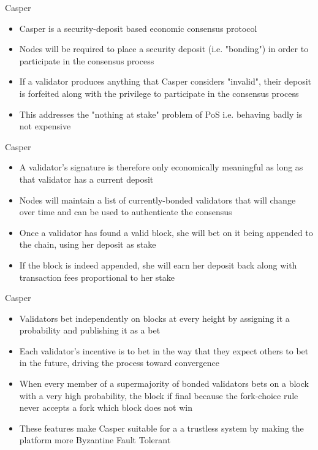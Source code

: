 \documentclass[10pt]{beamer}
\begin{document}

\begin{frame}{Casper}
	\begin{itemize}
		\item Casper is a security-deposit based economic consensus protocol
		\item Nodes will be required to place a security deposit (i.e. "bonding") in order to participate in the consensus process
		\item If a validator produces anything that Casper considers "invalid", their deposit is forfeited along with the privilege to participate in the consensus process
		\item This addresses the "nothing at stake" problem of PoS i.e. behaving badly is not expensive
	\end{itemize}
\end{frame}


\begin{frame}{Casper}
	\begin{itemize}
		\item A validator's signature is therefore only economically meaningful as long as that validator has a current deposit
		\item Nodes will maintain a list of currently-bonded validators that will change over time and can be used to authenticate the consensus
		\item Once a validator has found a valid block, she will bet on it being appended to the chain, using her deposit as stake
		\item If the block is indeed appended, she will earn her deposit back along with transaction fees proportional to her stake
	\end{itemize}
\end{frame}


\begin{frame}{Casper}
	\begin{itemize}
		\item Validators bet independently on blocks at every height by assigning it a probability and publishing it as a bet
		\item Each validator's incentive is to bet in the way that they expect others to bet in the future, driving the process toward convergence
		\item When every member of a supermajority of bonded validators bets on a block with a very high probability, the block if final because the fork-choice rule never accepts a fork which block does not win
		\item These features make Casper suitable for a a trustless system by making the platform more Byzantine Fault Tolerant
	\end{itemize}
\end{frame}
\end{document}
